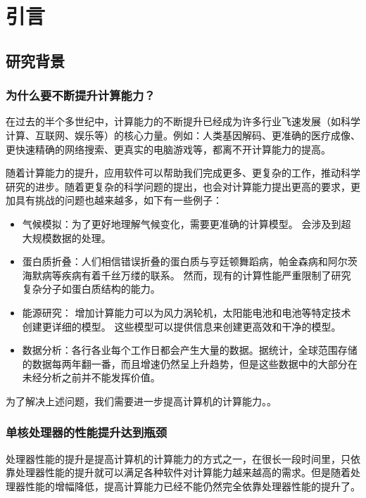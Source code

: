 
\chapter{引言}
\label{chap:intro1}

\section{研究背景}

\subsection{为什么要不断提升计算能力？}

在过去的半个多世纪中，计算能力的不断提升已经成为许多行业飞速发展（如科学计算、互联网、娱乐等）的核心力量。例如：人类基因解码、更准确的医疗成像、更快速精确的网络搜索、更真实的电脑游戏等，都离不开计算能力的提高。

随着计算能力的提升，应用软件可以帮助我们完成更多、更复杂的工作，推动科学研究的进步。随着更复杂的科学问题的提出，也会对计算能力提出更高的要求，更加具有挑战的问题也越来越多，如下有一些例子：

\begin{itemize}
	\item 气候模拟：为了更好地理解气候变化，需要更准确的计算模型。 会涉及到超大规模数据的处理。
	\item 蛋白质折叠：人们相信错误折叠的蛋白质与亨廷顿舞蹈病，帕金森病和阿尔茨海默病等疾病有着千丝万缕的联系。 然而，现有的计算性能严重限制了研究复杂分子如蛋白质结构的能力。
	\item 能源研究： 增加计算能力可以为风力涡轮机，太阳能电池和电池等特定技术创建更详细的模型。 这些模型可以提供信息来创建更高效​​和干净的模型。
	\item 数据分析：各行各业每个工作日都会产生大量的数据。据统计，全球范围存储的数据每两年翻一番，而且增速仍然呈上升趋势，但是这些数据中的大部分在未经分析之前并不能发挥价值。
\end{itemize}

为了解决上述问题，我们需要进一步提高计算机的计算能力。\citep{pacheco2011introduction}。

\subsection{单核处理器的性能提升达到瓶颈}

处理器性能的提升是提高计算机的计算能力的方式之一，在很长一段时间里，只依靠处理器性能的提升就可以满足各种软件对计算能力越来越高的需求。但是随着处理器性能的增幅降低，提高计算能力已经不能仍然完全依靠处理器性能的提升了。

